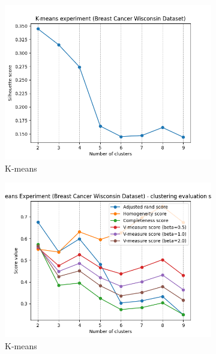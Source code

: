 \documentclass[12pt]{article}
\begin{document}
\begin{figure}[H]
    \centering
    \centering
    \begin{subfigure}[t]{0.19\textwidth}
        \includegraphics[width=\linewidth]{img/other_datasets/cancer_kmeans_silhouette.png}
        \caption{K-means}
    \end{subfigure}
    \hfill
    \begin{subfigure}[t]{0.19\textwidth}
        \includegraphics[width=\linewidth]{img/other_datasets/cancer_kmeans_scores.png}
        \caption{K-means}
    \end{subfigure}
    \hfill
    \begin{subfigure}[t]{0.19\textwidth}

\end{subfigure}
\end{figure}
\end{document}

